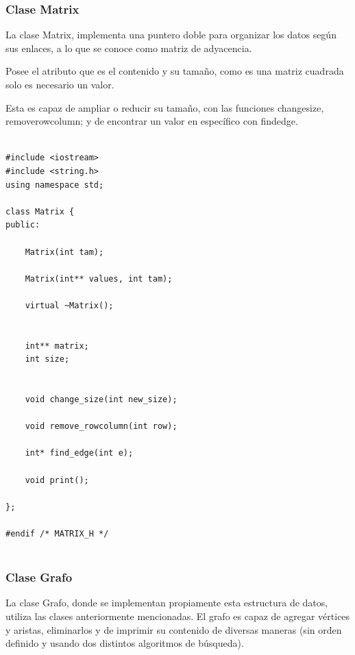 \documentclass[11pt]{article}
\begin{document}
\subsubsection{Clase Matrix}

La clase Matrix, implementa una puntero doble para organizar los datos según sus enlaces, a lo que se conoce como matriz de adyacencia. 

Posee el atributo que es el contenido y su tamaño, como es una matriz cuadrada solo es necesario un valor. 

Esta es capaz de ampliar o reducir su tamaño, con las funciones changesize, removerowcolumn; y de encontrar un valor en específico con findedge.

\lstset {language=C}
\begin{lstlisting}

#include <iostream>
#include <string.h>
using namespace std;

class Matrix {
public:

    Matrix(int tam);

    Matrix(int** values, int tam);

    virtual ~Matrix();
    
        
    int** matrix;
    int size;

    
    void change_size(int new_size);
    
    void remove_rowcolumn(int row);
    
    int* find_edge(int e);
    
    void print();

};

#endif /* MATRIX_H */


\end{lstlisting}



\subsubsection{Clase Grafo}
La clase Grafo, donde se implementan propiamente esta estructura de datos, utiliza las clases anteriormente mencionadas. El grafo es capaz de agregar vértices y aristas, eliminarlos y de imprimir su contenido de diversas maneras (sin orden definido y usando dos distintos algoritmos de búsqueda). 
\newpage 
\end{document}
